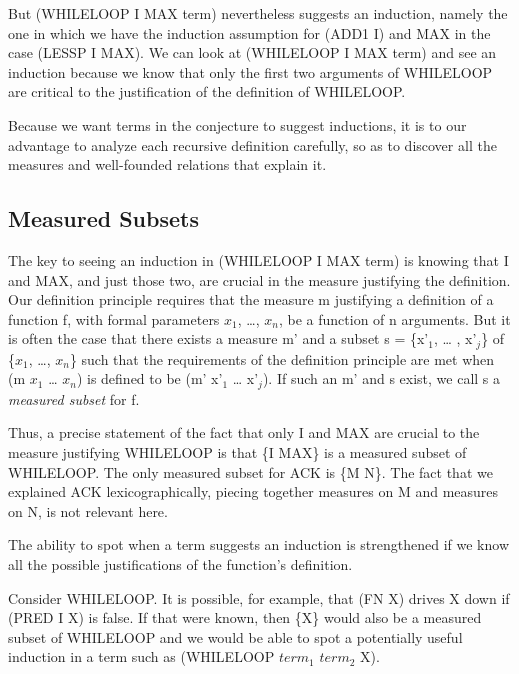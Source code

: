 \documentclass[10pt]{book}
\begin{document}
But (WHILELOOP I MAX term) nevertheless suggests an induction, namely
the one in which we have the induction assumption
for (ADD1 I) and MAX in the case  (LESSP I MAX).
We can look at (WHILELOOP I MAX term) and see
an induction because we know that only the first two arguments
of WHILELOOP are  critical to the justification of the definition of WHILELOOP.

Because we want terms in the conjecture to suggest inductions,
it is to our advantage to analyze each recursive definition carefully, so as
to discover all the measures and well-founded relations that explain
it.

\subsection{Measured Subsets}
The key to seeing an induction in (WHILELOOP I MAX term) is
knowing that I and MAX, and just those two, are crucial in the measure
justifying the definition.  Our definition principle requires that
the measure m justifying a definition of a function f, with
formal parameters $x_{1}$, \ldots{}, $x_{n}$, be a function of n arguments.
But it is often the case that there exists a measure m' and a subset
s = \{x'$_{1}$, \ldots{} , x'$_{j}$\} of \{$x_{1}$, \ldots{}, $x_{n}$\} such that the
requirements of the definition principle are met when (m $x_{1}$ \ldots{} $x_{n}$)
is defined to be (m' x'$_{1}$ \ldots{} x'$_{j}$).  If such an m' and s
exist, we call s a \emph{measured subset} for f.

Thus, a precise statement of the fact that only I and MAX
are crucial to the measure justifying WHILELOOP is that \{I MAX\}
is a measured subset of WHILELOOP.
The only measured subset for ACK is \{M N\}.  The
fact that we explained ACK lexicographically, piecing
together measures on M and measures on N, is not relevant
here. 

The ability to spot when a term suggests an induction
is strengthened if we know all the possible justifications of
the function's definition.

Consider WHILELOOP.  It is possible, for example, that (FN X) drives X down if (PRED I X) is false.
If that were known, then \{X\} would also be a measured subset of WHILELOOP
and we would be able to spot a potentially useful
induction in a term such as (WHILELOOP $term_{1}$ $term_{2}$ X).
\end{document}
